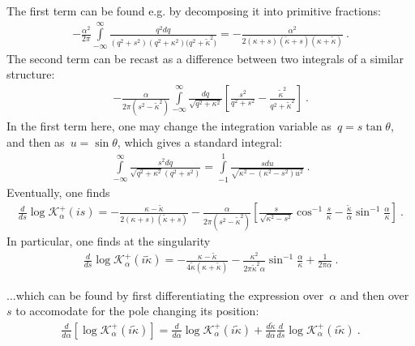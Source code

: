 \documentclass[preprint,aps,eqsecnum, prb]{revtex4-1}
\newcommand{\fplus}[1]{{#1}^{+}}
\begin{document}
The first term can be found e.g. by decomposing it
into primitive fractions:
\begin{align}
  -\frac{\alpha^2}{2\pi}\int\limits_{-\infty}^{\infty}
  \frac{q^2 dq}{(q^2 + s^2) (q^2 + \kappa^2)
  (q^2 + {\tilde{\kappa}^2)}} =
  -\frac{\alpha^2}{2(\kappa + s) ({\tilde{\kappa}} + s)
  (\kappa + {\tilde\kappa})}\ . 
\end{align}
The second term can be recast as a difference between
two integrals of a similar structure:
\begin{align}
  -\frac{\alpha}{2\pi(s^2 - \tilde{\kappa}^2)}
  \int\limits_{-\infty}^{\infty}
  \frac{dq}{\sqrt{q^2 + \kappa^2}}
  \left[\frac{s^2}{q^2 + s^2}
  - \frac{\tilde{\kappa}^2}{q^2 + {\tilde\kappa}^2}\right]\ . 
\end{align}
In the first term here, one may change the integration variable
as~$q = s \tan \theta$, and then as~$u = \sin\theta$, which gives
a standard integral:
\begin{align}
  \int\limits_{-\infty}^{\infty} \frac{s^2 dq}{\sqrt{q^2 + \kappa^2} (q^2 + s^2)} =
  \int\limits_{-1}^{1} \frac{sdu}{\sqrt{\kappa^2 - (\kappa^2 - s^2) u^2}}\ . 
\end{align}
Eventually, one finds
\begin{align}
  \frac{d}{ds} \log \fplus{\mathcal{K}}_{\alpha}(is) = 
  -\frac{\kappa - {\tilde{\kappa}}}{2(\kappa + s) ({\tilde{\kappa}} + s)}
  - \frac{\alpha}{2\pi (s^2 -\tilde{\kappa}^2)}
  \left[\frac{s}{\sqrt{\kappa^2 - s^2}} \cos^{-1}\frac{s}{\kappa}
  - \frac{{\tilde{\kappa}}}{\alpha}
  \sin^{-1}\frac{\alpha}{\kappa}\right]
  \ . 
\end{align}
In particular, one finds at the singularity
\begin{align}
  \label{eq:appA-2nd-half}
  \frac{d}{ds} \log \fplus{\mathcal{K}}_{\alpha}(i{\tilde\kappa})
  = - \frac{\kappa - {\tilde{\kappa}}}{4{\tilde \kappa} (\kappa + {\tilde\kappa})}
  - \frac{\kappa^2}{2\pi{\tilde\kappa}^2 \alpha}
  \sin^{-1}\frac{\alpha}{\kappa} + \frac{1}{2\pi\alpha}\ .
\end{align}


...which can be found by first differentiating the expression over~$\alpha$
and then over~$s$ to accomodate for the pole changing its position:
\begin{align}
  \label{eq:appA-two-contribs}
  \frac{d}{d\alpha} [\log \fplus{\mathcal{K}}_\alpha(i{\tilde \kappa})] =
  \frac{d}{d\alpha} \log \fplus{\mathcal{K}}_\alpha(i{\tilde \kappa})
  + \frac{d{\tilde \kappa}}{d\alpha}
  \frac{d}{ds} \log \fplus{\mathcal{K}}_\alpha (i{\tilde \kappa}) \ .
\end{align}
\end{document}
